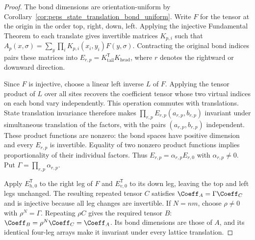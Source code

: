 \begin{proof}\leanok
    The bond dimensions are orientation-uniform by
    Corollary~\ref{cor:peps_state_translation_bond_uniform}.
    Write $F$ for the tensor at the origin in the order top, right, down, left.
    Applying the injective Fundamental Theorem to each translate gives
    invertible matrices $K_{p,i}$ such that
    $A_p(x,\sigma)=\sum_y\prod_iK_{p,i}(x_i,y_i)F(y,\sigma)$.
    Contracting the original bond indices pairs these matrices into
    $E_{r,p}=K_{\mathrm{tail}}^{\mathsf T}K_{\mathrm{head}}$, where
    $r$ denotes the rightward or downward direction.

    Since $F$ is injective, choose a linear left inverse $L$ of $F$.
    Applying the tensor product of $L$ over all sites recovers the coefficient
    tensor whose two virtual indices on each bond vary independently.
    This operation commutes with translations. State translation invariance
    therefore makes $\prod_{r,p}E_{r,p}(a_{r,p},b_{r,p})$ invariant under
    simultaneous translation of the factors, with the pairs
    $(a_{r,p},b_{r,p})$ independent. These product functions are nonzero:
    the bond spaces have positive dimension and every $E_{r,p}$ is invertible.
    Equality of two nonzero product functions implies proportionality of
    their individual factors. Thus
    $E_{r,p}=\alpha_{r,p}E_{r,0}$ with $\alpha_{r,p}\ne0$.
    Put $\Gamma=\prod_{r,p}\alpha_{r,p}$.

    Apply $E_{h,0}^{\mathsf T}$ to the right leg of $F$ and
    $E_{v,0}^{\mathsf T}$ to its down leg, leaving the top and left legs
    unchanged. The resulting repeated tensor $C$ satisfies
    $\Coeff_A=\Gamma\Coeff_C$ and is injective because all leg changes are
    invertible. If $N=nm$, choose $\rho\ne0$ with $\rho^N=\Gamma$.
    Repeating $\rho C$ gives the required tensor $B$:
    $\Coeff_B=\rho^N\Coeff_C=\Coeff_A$.
    Its bond dimensions are those of $A$, and its identical four-leg arrays
    make it invariant under every lattice translation.
\end{proof}

